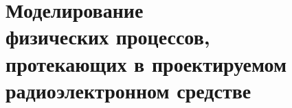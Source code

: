 \section{Моделирование \\
  физических процессов, \\
  протекающих в проектируемом\\
  радиоэлектронном средстве}

  
  


\newpage

